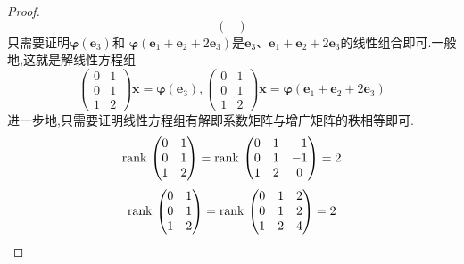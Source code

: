 {\begin{proof}
\[\begin{pmatrix}
            \end{pmatrix}
        \]
        只需要证明$\bm{\varphi}\left(\bm{e}_3\right)$和
        $\bm{\varphi}\left(\bm{e}_1+\bm{e}_2+2
            \bm{e}_3\right)$是$\bm{e}_3$、$\bm{e}_1
            +\bm{e}_2+2\bm{e}_3$的线性组合即可.一般地,这就是解线性方程组
        \[
            \begin{pmatrix}
                0 & 1 \\0&1\\1 & 2
            \end{pmatrix}\bm{x}=\bm{\varphi}\left(\bm{e}_3\right)
            ,
            \begin{pmatrix}
                0 & 1 \\0&1\\1 & 2
            \end{pmatrix}\bm{x}=\bm{\varphi}\left(\bm{e}_1+\bm{e}_2+2\bm{e}_3\right)
        \]
        进一步地,只需要证明线性方程组有解即系数矩阵与增广矩阵的秩相等即可.
        \[
            \operatorname{rank\,} \begin{pmatrix}
                0 & 1 \\0&1\\1 & 2
            \end{pmatrix}=\operatorname{rank\,} \begin{pmatrix}
                0 & 1 & -1 \\0&1&-1\\1 & 2 & 0
            \end{pmatrix}=2
        \]
        \[
            \operatorname{rank\,} \begin{pmatrix}
                0 & 1 \\0&1\\1 & 2
            \end{pmatrix}=\operatorname{rank\,} \begin{pmatrix}
                0 & 1 & 2 \\0&1&2\\1 & 2 & 4
            \end{pmatrix}=2
            \qedhere
        \]
    \end{proof}
}
